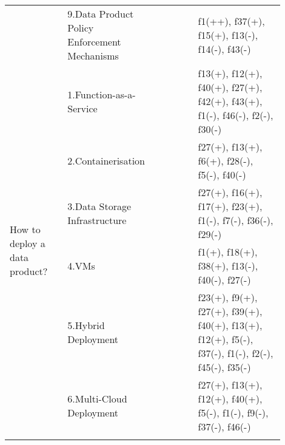 \begin{tabular}{|p{0.12\linewidth}|p{0.015\linewidth}|p{0.3\linewidth}|p{0.15\linewidth}|p{0.31\linewidth}|}
 & \multirow{-9}{\linewidth}{ \cellcolor{emerald_shape_7}{61}} &9.Data Product Policy Enforcement Mechanisms&\cellcolor{emerald_shape_4}{s1, s3, s4, s5, s6, s12, s15, s20, s23, s27, s31, s32, s36, s38, s39, s40, s43, s47, s52, s56, p5} & f1(++), f37(+), f15(+), f13(-), f14(-), f43(-)\\
\multirow{6}{\linewidth}{How to deploy a data product?} &\cellcolor{emerald_shape_5}{} &1.Function-as-a-Service&\cellcolor{emerald_shape_4}{s15, s21, s30, s31, s32, s33, s35, s36} & f13(+), f12(+), f40(+), f27(+), f42(+), f43(+), f1(-), f46(-), f2(-), f30(-)\\
 & \cellcolor{emerald_shape_5}{} & 2.Containerisation&\cellcolor{emerald_shape_5}{s14, s15, s30, s32, s33, s45, s47, p3, p4, p6, p10} & f27(+), f13(+), f6(+), f28(-), f5(-), f40(-)\\
 & \cellcolor{emerald_shape_5}{} & 3.Data Storage Infrastructure&\cellcolor{emerald_shape_6}{s4, s13, s15, s19, s25, s32, s33, s36, s38, s40, s49, p1, p3, p4, p5, p6, p7, p8} & f27(+), f16(+), f17(+), f23(+), f1(-), f7(-), f36(-), f29(-)\\
 & \cellcolor{emerald_shape_5}{} & 4.VMs&\cellcolor{emerald_shape_3}{s15, s47, p1, p3, p4} & f1(+), f18(+), f38(+), f13(-), f40(-), f27(-)\\
 & \cellcolor{emerald_shape_5}{} & 5.Hybrid Deployment&\cellcolor{emerald_shape_3}{s4, s47, p2, p8} & f23(+), f9(+), f27(+), f39(+), f40(+), f13(+), f12(+), f5(-), f37(-), f1(-), f2(-), f45(-), f35(-)\\
 & \multirow{-6}{\linewidth}{ \cellcolor{emerald_shape_5}{30}} &6.Multi-Cloud Deployment&\cellcolor{emerald_shape_3}{s4, s47, p6} & f27(+), f13(+), f12(+), f40(+), f5(-), f1(-), f9(-), f37(-), f46(-)\\
\hline
\multicolumn{5}{l}{\parbox{\textwidth}{\smallskip
}}
\end{tabular}
